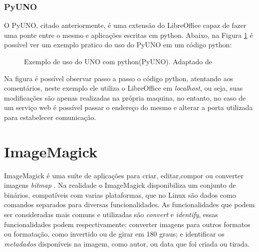 \subsubsection{PyUNO}
O PyUNO, citado anteriormente, é uma extensão do LibreOffice capaz de fazer uma ponte entre o mesmo e aplicações escritas em python. Abaixo, na Figura \ref{exemple_uno} é possível ver um exemplo pratico do uso do PyUNO em um código python:
\begin{figure}[ht]
    \centering
    \caption{Exemplo de uso do UNO com python(PyUNO). Adaptado de \cite{minetto 2008 pyuno}}
    \label{exemple_uno}
\end{figure}
Na figura é possível observar passo a passo o código python, atentando aos comentários, neste exemplo ele utiliza o LibreOffice em \textit{localhost}, ou seja, suas modificações são apenas realizadas na própria maquina, no entanto, no caso de um serviço web é possível passar o endereço do mesmo e alterar a porta utilizada para estabelecer comunicação.

\section{ImageMagick}
ImageMagick é uma suíte de aplicações para criar, editar,compor ou converter imagens \textit{bitmap} \cite{IMAGEMAGICK STUDIO 2012}.
Na realidade o ImageMagick disponibiliza um conjunto de binários, compatíveis com varias plataformas, que no Linux são dados como comandos separados para diversas funcionalidades.
As funcionalidades que podem ser consideradas mais comuns e utilizadas são \textit{convert} e \textit{identify}, essas funcionalidades podem respectivamente: converter imagens para outros formatos ou formatação, como invertido ou de girar em 180 graus; e identificar os \textit{metadados} disponíveis na imagem, como autor, ou data que foi criada ou tirada.

